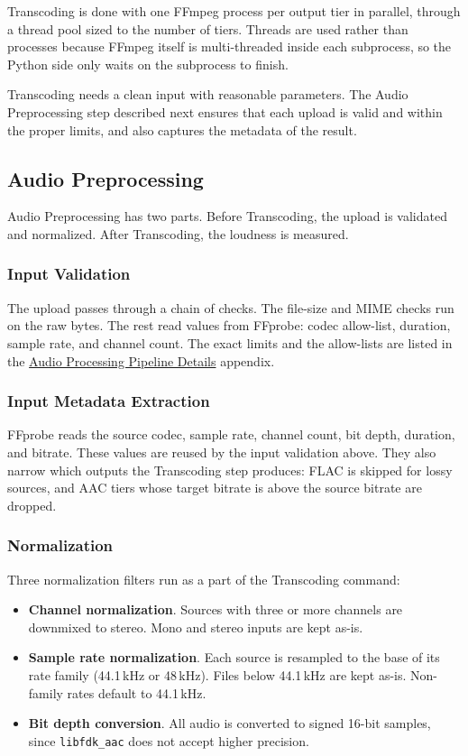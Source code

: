 Transcoding is done with one FFmpeg process per output tier in parallel,
through a thread pool sized to the number of tiers. Threads are used
rather than processes because FFmpeg itself is multi-threaded inside
each subprocess, so the Python side only waits on the subprocess to
finish.

Transcoding needs a clean input with reasonable parameters. The Audio
Preprocessing step described next ensures that each upload is valid
and within the proper limits, and also captures the metadata of the
result.

\subsection{Audio Preprocessing}
\label{subsec:audio_preprocessing}
Audio Preprocessing has two parts. Before Transcoding, the upload is
validated and normalized. After Transcoding, the loudness is measured.

\subsubsection*{Input Validation}
The upload passes through a chain of checks. The file-size and MIME
checks run on the raw bytes. The rest read values from FFprobe: codec
allow-list, duration, sample rate, and channel count. The exact
limits and the allow-lists are listed in the
\hyperref[app:audio_details]{Audio Processing Pipeline Details}
appendix.

\subsubsection*{Input Metadata Extraction}
FFprobe reads the source codec, sample rate, channel count, bit depth,
duration, and bitrate. These values are reused by the input validation
above. They also narrow which outputs the Transcoding step produces:
FLAC is skipped for lossy sources, and AAC tiers whose target
bitrate is above the source bitrate are dropped.

\subsubsection*{Normalization}
Three normalization filters run as a part of the Transcoding command:
\begin{itemize}
    \item \textbf{Channel normalization}. Sources with three or more
    channels are downmixed to stereo. Mono and stereo inputs are kept
    as-is.
    \item \textbf{Sample rate normalization}. Each source is resampled
    to the base of its rate family (44.1\,kHz or 48\,kHz). Files below
    44.1\,kHz are kept as-is. Non-family rates default to 44.1\,kHz.
    \item \textbf{Bit depth conversion}. All audio is converted to
    signed 16-bit samples, since \texttt{libfdk\_aac} does not accept
    higher precision.
\end{itemize}

